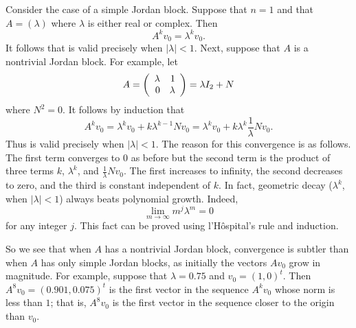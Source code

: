 Consider the case of a simple Jordan block.  
Suppose that $n=1$ and that 
$A=(\lambda)$ where $\lambda$ is either real or complex.  Then 
\[
A^kv_0 = \lambda^kv_0.
\]
It follows that  is valid precisely when $|\lambda|<1$.  
Next, suppose that $A$ is a nontrivial Jordan block.  For example, let 
\[
A=\left(\begin{array}{rr} \lambda & 1\\ 0 &\lambda\end{array}\right) = \lambda I_2+N
\]
where $N^2=0$.  It follows by induction that 
\[
A^kv_0 = \lambda^kv_0 + k\lambda^{k-1}Nv_0 = \lambda^kv_0 + 
k\lambda^k\frac{1}{\lambda}Nv_0.
\]
Thus  is valid precisely when $|\lambda|<1$.  The reason for this convergence is as follows.  The first term converges to $0$ as 
before but the second term is the product of three terms $k$, $\lambda^k$,
and $\frac{1}{\lambda}Nv_0$.  The first increases to infinity, the second
decreases to zero, and the third is constant independent of $k$.  In fact,
geometric decay 
($\lambda^k$, when $|\lambda|<1$) always beats 
polynomial growth.  Indeed,
\begin{equation}  \label{E:PG}
\lim_{m\to\infty}m^j\lambda^m = 0
\end{equation}
for any integer $j$.  This fact can be proved using l'H\^{o}spital's rule 
and induction.

So we see that when $A$ has a nontrivial Jordan block, convergence is 
subtler than when $A$ has only simple Jordan blocks, as initially the 
vectors $Av_0$ grow in magnitude.  For example, suppose that $\lambda=0.75$ 
and $v_0=(1,0)^t$.  Then $A^8v_0 = (0.901,0.075)^t$ is the first vector in 
the sequence $A^kv_0$ whose norm is less than $1$; that is, $A^8v_0$ is the 
first vector in the sequence closer to the origin than $v_0$.  


